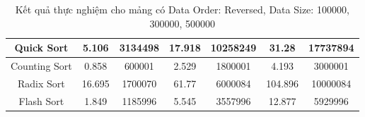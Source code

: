 \begin{table}[H]
{\begin{tabular}{|ccccccc|}
\multicolumn{1}{|c|}{Quick Sort} & \multicolumn{1}{c|}{5.106} & \multicolumn{1}{c|}{3134498} & \multicolumn{1}{c|}{17.918} & \multicolumn{1}{c|}{10258249} & \multicolumn{1}{c|}{31.28} & \multicolumn{1}{c|}{17737894} \\ \hline
\multicolumn{1}{|c|}{Counting Sort} & \multicolumn{1}{c|}{0.858} & \multicolumn{1}{c|}{600001} & \multicolumn{1}{c|}{2.529} & \multicolumn{1}{c|}{1800001} & \multicolumn{1}{c|}{4.193} & \multicolumn{1}{c|}{3000001} \\ \hline
\multicolumn{1}{|c|}{Radix Sort} & \multicolumn{1}{c|}{16.695} & \multicolumn{1}{c|}{1700070} & \multicolumn{1}{c|}{61.77} & \multicolumn{1}{c|}{6000084} & \multicolumn{1}{c|}{104.896} & \multicolumn{1}{c|}{10000084} \\ \hline
\multicolumn{1}{|c|}{Flash Sort} & \multicolumn{1}{c|}{1.849} & \multicolumn{1}{c|}{1185996} & \multicolumn{1}{c|}{5.545} & \multicolumn{1}{c|}{3557996} & \multicolumn{1}{c|}{12.877} & \multicolumn{1}{c|}{5929996} \\ \hline
\end{tabular}%
}
\caption{Kết quả thực nghiệm cho mảng có Data Order: Reversed, Data Size: 100000, 300000, 500000}
\label{tab:reversed_100000_300000_500000}
\end{table}

